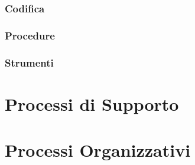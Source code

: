 \subsubsection {Codifica}
\subsubsection {Procedure}
\subsubsection {Strumenti}
\section {Processi di Supporto}
\section {Processi Organizzativi}